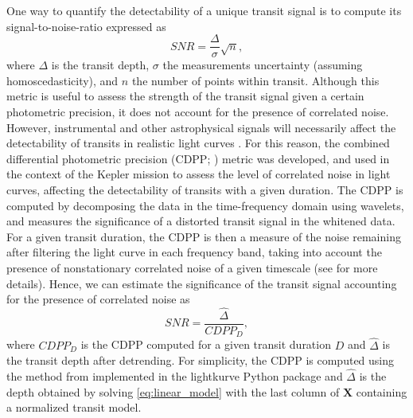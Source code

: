 \documentclass[modern,linenumbers]{aastex631}
\begin{document}
One way to quantify the detectability of a unique transit signal is to compute its signal-to-noise-ratio expressed as 
\begin{equation*}
  SNR= \frac{\Delta}{\sigma}\sqrt{n},
\end{equation*}
where $\Delta$ is the transit depth, $\sigma$ the measurements uncertainty (assuming homoscedasticity), and $n$ the number of points within transit. Although this metric is useful to assess the strength of the transit signal given a certain photometric precision, it does not account for the presence of correlated noise. However, instrumental and other astrophysical signals will necessarily affect the detectability of transits in realistic light curves \citep{Pont2006}. For this reason, the combined differential photometric precision (CDPP; \citealt{Jenkins2010}) metric was developed, and used in the context of the Kepler mission to assess the level of correlated noise in light curves, affecting the detectability of transits with a given duration. 
The CDPP is computed by decomposing the data in the time-frequency domain using wavelets, and measures the significance of a distorted transit signal in the whitened data. For a given transit duration, the CDPP is then a measure of the noise remaining after filtering the light curve in each frequency band, taking into account the presence of nonstationary correlated noise of a given timescale (see \citealt{Jenkins2010} for more details). Hence, we can estimate the significance of the transit signal accounting for the presence of correlated noise as
\begin{equation}\label{eq:snr}
  SNR= \frac{\hat{\Delta}}{CDPP_D},
\end{equation}
where $CDPP_D$ is the CDPP computed for a given transit duration $D$ and $\hat{\Delta}$ is the transit depth after detrending. For simplicity, the CDPP is computed using the method from \cite{Gilliland2011} implemented in the \textsf{lightkurve} Python package \citep{Lightkurve} and $\hat{\Delta}$ is the depth obtained by solving \autoref{eq:linear_model} with the last column of $\bm{X}$ containing a normalized transit model.
\end{document}
